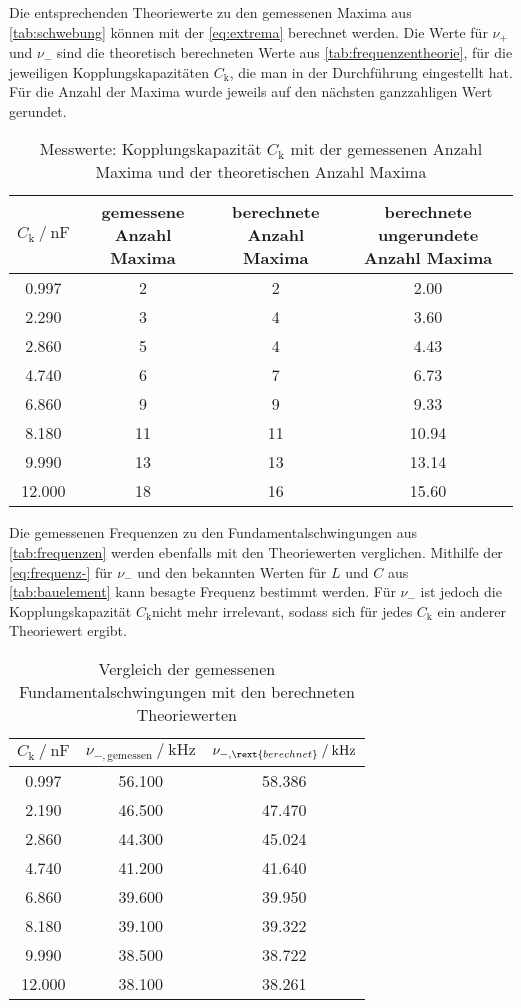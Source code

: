Die entsprechenden Theoriewerte zu den gemessenen Maxima aus \autoref{tab:schwebung} können mit der \autoref{eq:extrema} berechnet werden. Die Werte für $\nu _+$ und $\nu _-$ sind die theoretisch berechneten Werte aus \autoref{tab:frequenzentheorie}, für die jeweiligen Kopplungskapazitäten $C_\text{k}$, die man in der Durchführung eingestellt hat. Für die Anzahl der Maxima wurde jeweils auf den nächsten ganzzahligen Wert gerundet.

\begin{table}
  \centering
  \caption{Messwerte: Kopplungskapazität $C_\text{k}$ mit der gemessenen Anzahl Maxima und der theoretischen Anzahl Maxima }
  \label{tab:schwebungstheorie}
  \begin{tabular}{c c c c}
    \toprule 
    $C_\text{k} \:/\: \si{\nano\farad}$ & gemessene Anzahl Maxima &  berechnete Anzahl Maxima & berechnete ungerundete Anzahl Maxima \\ 
    \midrule 
    0.997 & 2 & 2 & 2.00 \\
    2.290 & 3 & 4 & 3.60\\
    2.860 & 5 & 4 & 4.43\\
    4.740 & 6 & 7 & 6.73\\
    6.860 & 9 & 9 & 9.33\\
    8.180 & 11 & 11 & 10.94 \\
    9.990 & 13 & 13 & 13.14\\
    12.000 & 18 & 16 & 15.60 \\
    \bottomrule
  \end{tabular}
\end{table}

Die gemessenen Frequenzen zu den Fundamentalschwingungen aus \autoref{tab:frequenzen} werden ebenfalls mit den Theoriewerten verglichen. Mithilfe der \autoref{eq:frequenz-} für $\nu _-$ und den bekannten Werten für $L$ und $C$ aus \autoref{tab:bauelement} kann besagte Frequenz bestimmt werden. Für $\nu_-$ ist jedoch die Kopplungskapazität $C_\text{k}$nicht mehr irrelevant, sodass sich für jedes $C_\text{k}$ ein anderer Theoriewert ergibt.

\begin{table}
  \centering
  \caption{Vergleich der gemessenen Fundamentalschwingungen mit den berechneten Theoriewerten}
  \label{tab:frequenzentheorie}
  \begin{tabular}{c c c}
    \toprule 
    $C_\text{k} \:/\: \si{\nano\farad}$ & $\nu _{-,\text{gemessen}} \:/\: \si{\kilo\hertz}$ & $\nu _{-,\rext{berechnet}} \:/\: \si{\kilo\hertz}$    \\ 
    \midrule 
    0.997 & 56.100 & 58.386 \\
    2.190 & 46.500 & 47.470 \\
    2.860 & 44.300 & 45.024 \\
    4.740 & 41.200 & 41.640 \\
    6.860 & 39.600 & 39.950 \\
    8.180 & 39.100 & 39.322 \\
    9.990 & 38.500 & 38.722 \\
    12.000 & 38.100 & 38.261 \\
    \bottomrule
  \end{tabular}
\end{table}


